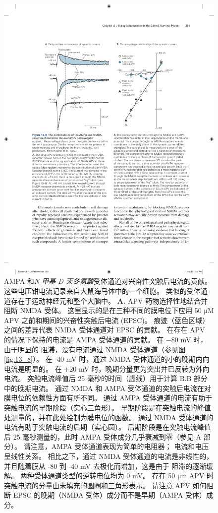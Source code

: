 \begin{figure}[htbp]
	\centering
	\includegraphics[width=0.75\linewidth]{chap13/fig_13_9}
	\caption{AMPA 和\textit{N-甲基-D-天冬氨酸}受体通道对兴奋性突触后电流的贡献。 这些电压钳电流记录来自大鼠海马体中的一个细胞。 类似的受体通道存在于运动神经元和整个大脑中\cite{hestrin1990analysis}。
	\textbf{A.} APV 药物选择性地结合并阻断 NMDA 受体。
	这里显示的是在三种不同的膜电位下应用 50 μM APV 之前和期间的兴奋性突触后电流 (EPSC)。
	痕迹（蓝色区域）之间的差异代表 NMDA 受体通道对 EPSC 的贡献。 在存在 APV 的情况下保持的电流是 AMPA 受体通道的贡献。
	在 −80 mV 时，由于明显的  阻滞，没有电流通过 NMDA 受体通道（参见图 \ref{fig:13_8}）。
	在 -40 mV 时，通过 NMDA 受体通道的小的晚期内向电流是明显的。 
	在 +20 mV 时，晚期分量更为突出并已反转为外向电流。
	突触电流峰值后 25 毫秒的时间（虚线）用于计算 B.B 部分中的晚期电流。
	通过 NMDA 和 AMPA 受体通道的突触后电流在对膜电位的依赖性方面有所不同。
	通过 AMPA 受体通道的电流有助于突触电流的早期阶段（实心三角形）。
	早期阶段是在突触电流的峰值处测量的，并在此处绘制为膜电位的函数。
	通过 NMDA 受体通道的电流有助于突触电流的后期（实心圆）。
	后期阶段是在突触电流峰值后 25 毫秒测量的，此时 AMPA 受体成分几乎衰减到零（参见 A 部分）。
	请注意，AMPA 受体通道表现为简单的电阻器； 电流和电压呈线性关系。
	相比之下，通过 NMDA 受体通道的电流是非线性的，并且随着膜从 -80 到 -40 mV 去极化而增加，这是由于  阻滞的逐渐缓解。 两种受体通道类型的逆转电位均为 0 mV。
	存在 50 μm APV 时突触电流的分量由未填充的圆圈和三角形表示。
	请注意 APV 如何阻断 EPSC 的晚期（NMDA 受体）成分而不是早期（AMPA 受体）成分。}
	\label{fig:13_9}
\end{figure}


